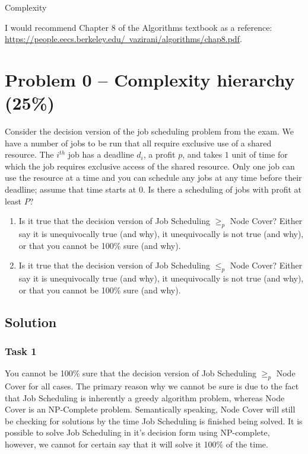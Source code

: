 \documentclass[12pt,letterpaper]{article}
\begin{document}
\begin{center}
    \LARGE Complexity
\end{center}

I would recommend Chapter 8 of the Algorithms textbook as a reference:\\
\href{https://people.eecs.berkeley.edu/~vazirani/algorithms/chap8.pdf}{https://people.eecs.berkeley.edu/~vazirani/algorithms/chap8.pdf}.


\section*{Problem 0 -- Complexity hierarchy (25\%)}
Consider the decision version of the job scheduling problem from the exam.
We have a number of jobs to be run that all require exclusive use of a shared resource.
The $i^{th}$ job has a deadline $d_i$, a profit $p$, and takes $1$ unit of time for which the job requires exclusive access of the shared resource.
Only one job can use the resource at a time and you can schedule any jobs at any time before their deadline; assume that time starts at $0$.
Is there a scheduling of jobs with profit at least $P$?

\begin{enumerate}
    \item Is it true that the decision version of Job Scheduling $\geq_p$ Node Cover? Either say it is unequivocally true (and why), it unequivocally is not true (and why), or that you cannot be 100\% sure (and why).
    \item Is it true that the decision version of Job Scheduling $\leq_p$ Node Cover? Either say it is unequivocally true (and why), it unequivocally is not true (and why), or that you cannot be 100\% sure (and why).
\end{enumerate}

\newpage
\subsection*{Solution}

\subsubsection*{Task 1}

You cannot be 100\% sure that the decision version of Job Scheduling $\geq_p$ Node Cover for all cases. The primary reason why we cannot be sure is due to the fact that Job Scheduling is inherently a greedy algorithm problem, whereas Node Cover is an NP-Complete problem. Semantically speaking, Node Cover will still be checking for solutions by the time Job Scheduling is finished being solved. It is possible to solve Job Scheduling in it's decision form using NP-complete, however, we cannot for certain say that it will solve it 100\% of the time.  
\end{document}
